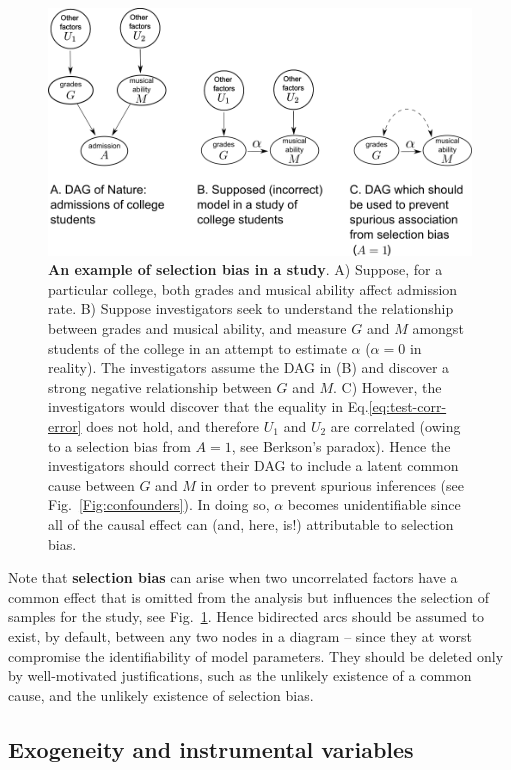 \documentclass[11pt]{article}
\numberwithin{equation}{section}
\begin{document}
\begin{figure}
\begin{center}
\includegraphics[width=0.8\columnwidth]{figures/selection-bias.png}  
\end{center}
\caption{\textbf{An example of selection bias in a study}. A) Suppose, for a particular college, both grades and musical ability affect admission rate. B) Suppose investigators seek to understand the relationship between grades and musical ability, and measure $G$ and $M$ amongst students of the college in an attempt to estimate $\alpha$ ($\alpha=0$ in reality). The investigators assume the DAG in (B) and discover a strong negative relationship between $G$ and $M$. C) However, the investigators would discover that the equality in Eq.\eqref{eq:test-corr-error} does not hold, and therefore $U_1$ and $U_2$ are correlated (owing to a selection bias from $A=1$, see Berkson's paradox). Hence the investigators should correct their DAG to include a latent common cause between $G$ and $M$ in order to prevent spurious inferences (see Fig.~\ref{Fig:confounders}). In doing so, $\alpha$ becomes unidentifiable since all of the causal effect can (and, here, is!) attributable to selection bias.}
\label{Fig:selection-bias}
\end{figure}

Note that \textbf{selection bias} can arise when two uncorrelated factors have a common effect that is omitted from the analysis but influences the selection of samples for the study, see Fig.~\ref{Fig:selection-bias}. Hence bidirected arcs should be assumed to exist, by default, between any two nodes in a diagram -- since they at worst compromise the identifiability of model parameters. They should be deleted only by well-motivated justifications, such as the unlikely existence of a common cause, and the unlikely existence of selection bias.

\subsection{Exogeneity and instrumental variables}
\end{document}
